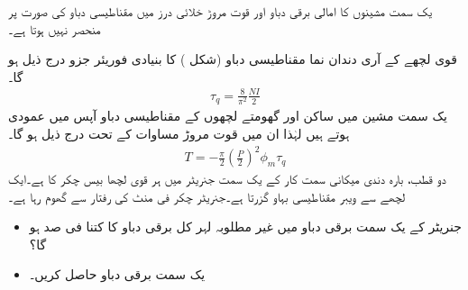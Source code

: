 یک سمت  مشینوں کا امالی برقی دباو اور قوت مروڑ خلائی درز میں مقناطیسی دباو کی صورت پر منحصر نہیں ہوتا ہے۔

 قوی لچھے کے آری دندان نما مقناطیسی دباو (شکل )   کا بنیادی فوریئر جزو درج ذیل ہو گا۔
\begin{align}
\tau_q=\frac{8}{\pi^2} \frac{N I}{2}
\end{align}
یک سمت  مشین میں ساکن اور گھومتے لچھوں کے مقناطیسی دباو آپس میں عمودی ہوتے ہیں لہٰذا ان میں قوت مروڑ مساوات   کے تحت درج ذیل ہو گا۔
\begin{align}\label{مساوات_یکسمتی_مروڑ}
T=-\frac{\pi}{2}\left( \frac{P}{2}\right)^2 \phi_m \tau_q 
\end{align} 
%
دو قطب، بارہ دندی میکانی سمت کار کے یک سمت  جنریٹر میں ہر قوی لچھا بیس چکر کا ہے۔ایک لچھے سے  ویبر  مقناطیسی بہاو گزرتا    ہے۔جنریٹر  چکر فی منٹ کی رفتار سے گھوم رہا ہے۔
\begin{itemize}
\item
جنریٹر کے یک سمت  برقی دباو میں غیر مطلوبہ لہر کل برقی دباو کا کتنا فی صد ہو گا؟
\item
یک سمت  برقی دباو حاصل کریں۔
\end{itemize}

